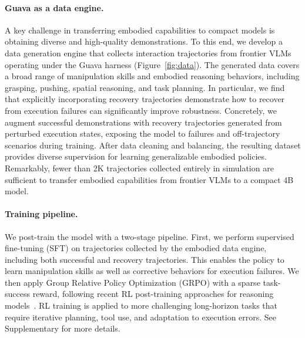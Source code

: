 \documentclass{llmxive}
\begin{document}
\vspace{-2mm}
\paragraph{Guava as a data engine.}
A key challenge in transferring embodied capabilities to compact models is obtaining diverse and high-quality demonstrations. 
To this end, we develop a data generation engine that collects interaction trajectories from frontier VLMs operating under the Guava harness (Figure~\ref{fig:data}). 
The generated data covers a broad range of manipulation skills and embodied reasoning behaviors, including grasping, pushing, spatial reasoning, and task planning.
In particular, we find that explicitly incorporating recovery trajectories demonstrate how to recover from execution failures can significantly improve robustness. Concretely, we augment successful demonstrations with recovery trajectories generated from perturbed execution states, exposing the model to failures and off-trajectory scenarios during training.
After data cleaning and balancing, the resulting dataset provides diverse supervision for learning generalizable embodied policies. Remarkably, fewer than 2K trajectories collected entirely in simulation are sufficient to transfer embodied capabilities from frontier VLMs to a compact 4B model.

\vspace{-2mm}
\paragraph{Training pipeline.}
\label{sec}
We post-train the model with a two-stage pipeline. First, we perform supervised fine-tuning (SFT) on trajectories collected by the embodied data engine, including both successful and recovery trajectories. This enables the policy to learn manipulation skills as well as corrective behaviors for execution failures. We then apply Group Relative Policy Optimization (GRPO) with a sparse task-success reward, following recent RL post-training approaches for reasoning models~\citep{shao2024deepseekmathpushinglimitsmathematical, zhou2025r1zerosahamomentvisual}. RL training is applied to more challenging long-horizon tasks that require iterative planning, tool use, and adaptation to execution errors. See Supplementary for more details. 
\end{document}
